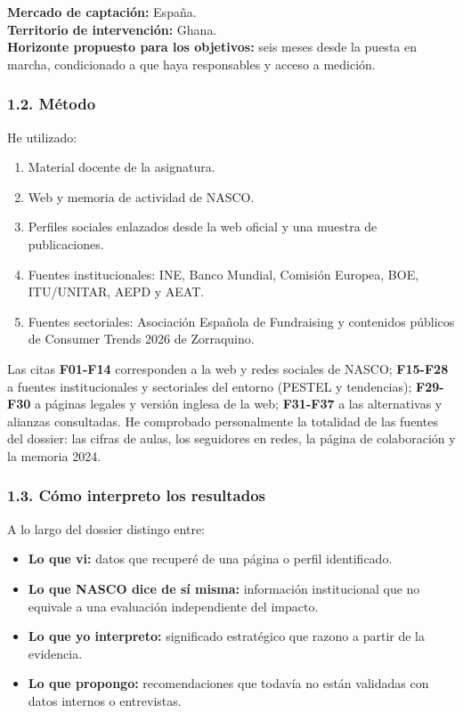 \documentclass[
]{article}
\providecommand{\tightlist}{%
  \setlength{\itemsep}{0pt}\setlength{\parskip}{0pt}}
\begin{document}
\textbf{Mercado de captación:} España.\\
\textbf{Territorio de intervención:} Ghana.\\
\textbf{Horizonte propuesto para los objetivos:} seis meses desde la
puesta en marcha, condicionado a que haya responsables y acceso a
medición.

\hypertarget{muxe9todo}{%
\subsubsection{1.2. Método}\label{muxe9todo}}

He utilizado:

\begin{enumerate}
\def\labelenumi{\arabic{enumi}.}
\tightlist
\item
  Material docente de la asignatura.
\item
  Web y memoria de actividad de NASCO.
\item
  Perfiles sociales enlazados desde la web oficial y una muestra de
  publicaciones.
\item
  Fuentes institucionales: INE, Banco Mundial, Comisión Europea, BOE,
  ITU/UNITAR, AEPD y AEAT.
\item
  Fuentes sectoriales: Asociación Española de Fundraising y contenidos
  públicos de Consumer Trends 2026 de Zorraquino.
\end{enumerate}

Las citas \textbf{F01-F14} corresponden a la web y redes sociales de
NASCO; \textbf{F15-F28} a fuentes institucionales y sectoriales del
entorno (PESTEL y tendencias); \textbf{F29-F30} a páginas legales y
versión inglesa de la web; \textbf{F31-F37} a las alternativas y
alianzas consultadas. He comprobado personalmente la totalidad de las
fuentes del dossier: las cifras de aulas, los seguidores en redes, la
página de colaboración y la memoria 2024.

\hypertarget{cuxf3mo-interpreto-los-resultados}{%
\subsubsection{1.3. Cómo interpreto los
resultados}\label{cuxf3mo-interpreto-los-resultados}}

A lo largo del dossier distingo entre:

\begin{itemize}
\tightlist
\item
  \textbf{Lo que vi:} datos que recuperé de una página o perfil
  identificado.
\item
  \textbf{Lo que NASCO dice de sí misma:} información institucional que
  no equivale a una evaluación independiente del impacto.
\item
  \textbf{Lo que yo interpreto:} significado estratégico que razono a
  partir de la evidencia.
\item
  \textbf{Lo que propongo:} recomendaciones que todavía no están
  validadas con datos internos o entrevistas.
\end{itemize}
\end{document}
